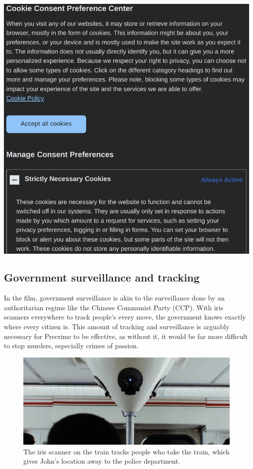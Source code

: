 \documentclass[11pt]{article}
\begin{document}
\begin{center}
\includegraphics[width=.9\linewidth]{./images/stack-overflow-cookie-banner.png}
\end{center}

 \newpage

\subsection{Government surveillance and tracking}
\label{sec:org9f39775}
In the film, government surveillance is akin to the surveillance
done by an authoritarian regime like the Chinese Communist Party (CCP).
With iris scanners everywhere to track people's every move,
the government knows exactly where every citizen is.
This amount of tracking and surveillance is arguably necessary for
Precrime to be effective, as without it, it would be far more
difficult to stop murders, especially crimes of passion.  \\

\begin{figure}[htbp]
\centering
\includegraphics[width=.9\linewidth]{./images/iris-scanner-on-the-train-used-to-track-people.png}
\caption{The iris scanner on the train tracks people who take the train, which gives John's location away to the police department.}
\end{figure}
\end{document}
